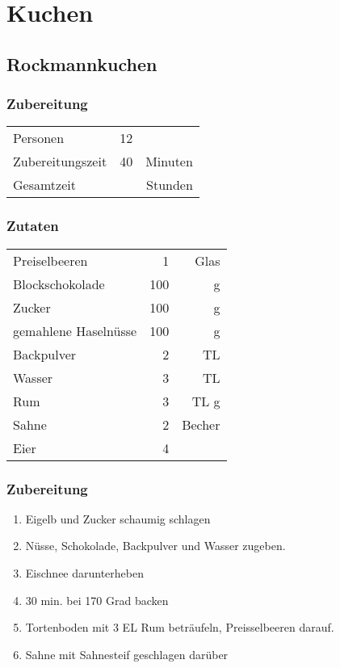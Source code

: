 \chapter{Kuchen}
\section{Rockmannkuchen}
\subsection*{Zubereitung}
\begin{tabular}{lrr}
	Personen         &                12 &  \\
	Zubereitungszeit &               40 & Minuten \\
	Gesamtzeit       &                   & Stunden \\
\end{tabular} 

\subsection*{Zutaten}
\begin{tabular}{lrr}
	Preiselbeeren        &   1 &   Glas \\
	Blockschokolade      & 100 &      g \\
	Zucker               & 100 &      g \\
	gemahlene Haselnüsse & 100 &      g \\
	Backpulver           &   2 &     TL \\
	Wasser               &   3 &     TL \\
	Rum                  &   3 &   TL g \\
	Sahne                &   2 & Becher \\
	Eier                 &   4 &
\end{tabular} 

\subsection*{Zubereitung}
\begin{enumerate}
	\item Eigelb und Zucker schaumig schlagen
	\item Nüsse, Schokolade, Backpulver und Wasser zugeben. 
	\item Eischnee darunterheben
	\item 30 min. bei 170 Grad backen
	\item Tortenboden mit 3 EL Rum beträufeln, Preisselbeeren darauf.
	\item Sahne mit Sahnesteif geschlagen darüber
\end{enumerate}
  
